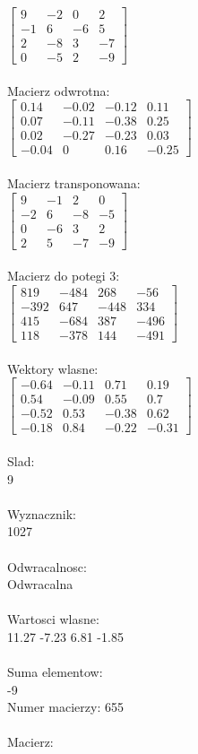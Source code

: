 \documentclass[a4paper,12pt]{article}
\begin{document}
$\begin{bmatrix} 9&-2&0&2\\-1&6&-6&5\\2&-8&3&-7\\0&-5&2&-9 \end{bmatrix}$
\\
\\
Macierz odwrotna:\\

$\begin{bmatrix} 0.14&-0.02&-0.12&0.11\\0.07&-0.11&-0.38&0.25\\0.02&-0.27&-0.23&0.03\\-0.04&0&0.16&-0.25 \end{bmatrix}$
\\
\\
Macierz transponowana:\\

$\begin{bmatrix} 9&-1&2&0\\-2&6&-8&-5\\0&-6&3&2\\2&5&-7&-9 \end{bmatrix}$
\\
\\
Macierz do potegi 3:\\

$\begin{bmatrix} 819&-484&268&-56\\-392&647&-448&334\\415&-684&387&-496\\118&-378&144&-491 \end{bmatrix}$
\\
\\
Wektory wlasne:\\

$\begin{bmatrix} -0.64&-0.11&0.71&0.19\\0.54&-0.09&0.55&0.7\\-0.52&0.53&-0.38&0.62\\-0.18&0.84&-0.22&-0.31 \end{bmatrix}$
\\
\\
Slad:\\
9
\\
\\
Wyznacznik:\\
1027
\\
\\
Odwracalnosc:\\
Odwracalna
\\
\\
Wartosci wlasne:\\
11.27 -7.23 6.81 -1.85
\\
\\
Suma elementow:\\
-9
\\
\newpage
Numer macierzy:
655
\\
\\
Macierz:\\
\end{document}
